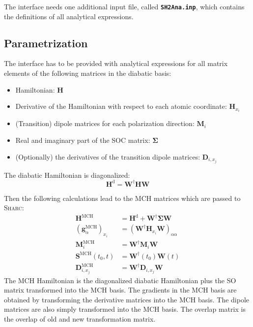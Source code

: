 \documentclass[a4paper,11pt,DIV=15,openany,twoside=false]{scrbook}
\newcommand{\sharc}{\textsc{Sharc}}
\newcommand{\ttt}[1]{\textbf{\texttt{#1}}}
\begin{document}
The interface needs one additional input file, called \ttt{SH2Ana.inp}, which contains the definitions of all analytical expressions.

\subsection{Parametrization}

The interface has to be provided with analytical expressions for all matrix elements of the following matrices in the diabatic basis:
\begin{itemize}
  \item Hamiltonian: $\mathbf{H}$
  \item Derivative of the Hamiltonian with respect to each atomic coordinate: $\mathbf{H}_{x_i}$
  \item (Transition) dipole matrices for each polarization direction: $\mathbf{M}_i$
  \item Real and imaginary part of the SOC matrix: $\boldsymbol{\Sigma}$
  \item (Optionally) the derivatives of the transition dipole matrices: $\mathbf{D}_{i,x_j}$
\end{itemize}

The diabatic Hamiltonian is diagonalized:
\begin{equation}
  \mathbf{H}^{\text{d}}=\mathbf{W}^\dagger\mathbf{H}\mathbf{W}
\end{equation}


Then the following calculations lead to the MCH matrices which are passed to \sharc:
\begin{align}
  \mathbf{H}^{\text{MCH}}&=\mathbf{H}^{\text{d}}+\mathbf{W}^\dagger\boldsymbol{\Sigma}\mathbf{W}\\
  \left(\mathbf{g}^{\text{MCH}}_\alpha\right)_{x_i}&=\left(\mathbf{W}^\dagger\mathbf{H}_{x_i}\mathbf{W}\right)_{\alpha\alpha}\\
  \mathbf{M}^{\text{MCH}}_i&=\mathbf{W}^\dagger\mathbf{M}_i\mathbf{W}\\
  \mathbf{S}^{\text{MCH}}(t_0,t)&=\mathbf{W}^\dagger(t_0)\mathbf{W}(t)\\
  \mathbf{D}^{\text{MCH}}_{i,x_j}&=\mathbf{W}^\dagger\mathbf{D}_{i,x_j}\mathbf{W}
\end{align}
The MCH Hamiltonian is the diagonalized diabatic Hamiltonian plus the SO matrix transformed into the MCH basis. The gradients in the MCH basis are obtained by transforming the derivative matrices into the MCH basis. The dipole matrices are also simply transformed into the MCH basis. The overlap matrix is the overlap of old and new transformation matrix.
\end{document}
